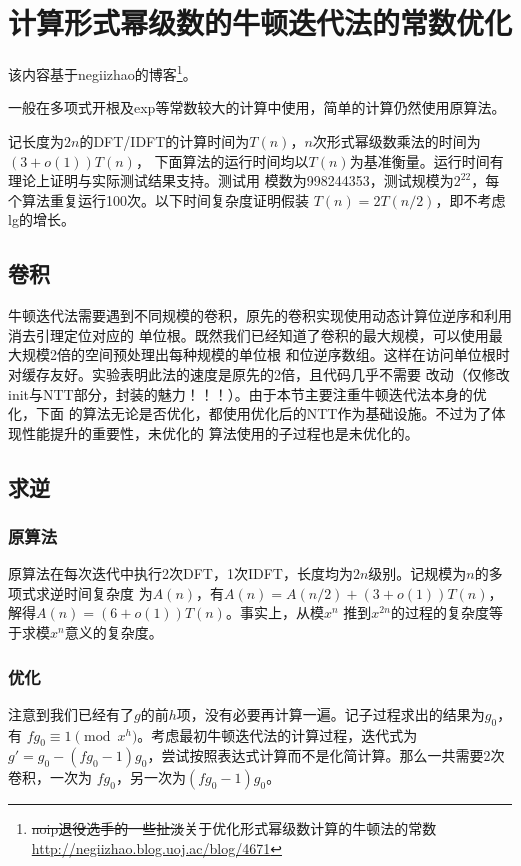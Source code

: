 \section{计算形式幂级数的牛顿迭代法的常数优化}
该内容基于negiizhao的博客\footnote{
    \sout{noip退役选手的一些扯淡}关于优化形式幂级数计算的牛顿法的常数\\
    \url{http://negiizhao.blog.uoj.ac/blog/4671}
}。

一般在多项式开根及exp等常数较大的计算中使用，简单的计算仍然使用原算法。

记长度为$2n$的DFT/IDFT的计算时间为$T(n)$，$n$次形式幂级数乘法的时间为$(3+o(1))T(n)$，
下面算法的运行时间均以$T(n)$为基准衡量。运行时间有理论上证明与实际测试结果支持。测试用
模数为998244353，测试规模为$2^{22}$，每个算法重复运行100次。以下时间复杂度证明假装
$T(n)=2T(n/2)$，即不考虑lg的增长。

\subsection{卷积}
牛顿迭代法需要遇到不同规模的卷积，原先的卷积实现使用动态计算位逆序和利用消去引理定位对应的
单位根。既然我们已经知道了卷积的最大规模，可以使用最大规模2倍的空间预处理出每种规模的单位根
和位逆序数组。这样在访问单位根时对缓存友好。实验表明此法的速度是原先的2倍，且代码几乎不需要
改动（仅修改init与NTT部分，封装的魅力！！！）。由于本节主要注重牛顿迭代法本身的优化，下面
的算法无论是否优化，都使用优化后的NTT作为基础设施。不过为了体现性能提升的重要性，未优化的
算法使用的子过程也是未优化的。

\subsection{求逆}
\subsubsection{原算法}
原算法在每次迭代中执行2次DFT，1次IDFT，长度均为$2n$级别。记规模为$n$的多项式求逆时间复杂度
为$A(n)$，有$A(n)=A(n/2)+(3+o(1))T(n)$，解得$A(n)=(6+o(1))T(n)$。事实上，从模$x^n$
推到$x^{2n}$的过程的复杂度等于求模$x^n$意义的复杂度。
\subsubsection{优化}
注意到我们已经有了$g$的前$h$项，没有必要再计算一遍。记子过程求出的结果为$g_0$，有
$fg_0\equiv 1\pmod{x^h}$。考虑最初牛顿迭代法的计算过程，迭代式为
$g'=g_0-(fg_0-1)g_0$，尝试按照表达式计算而不是化简计算。那么一共需要2次卷积，一次为
$fg_0$，另一次为$(fg_0-1)g_0$。

